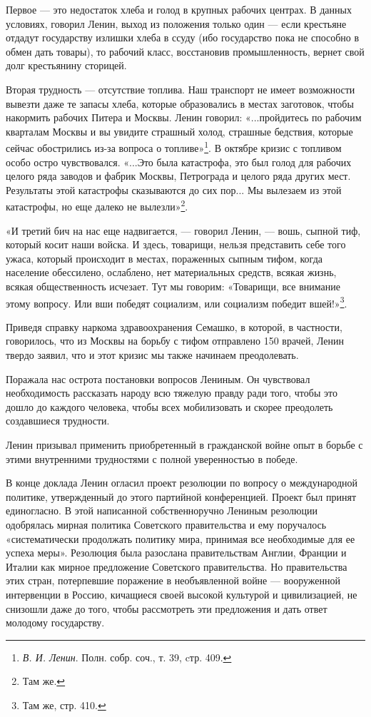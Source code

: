 \documentclass[12pt, a4paper, openany]{book}
\begin{document}
Первое — это недостаток хлеба и голод в крупных рабочих центрах. В данных условиях, говорил Ленин, выход из положения только один — если крестьяне отдадут государству излишки хлеба в ссуду (ибо государство пока не способно в обмен дать товары), то рабочий класс, восстановив промышленность, вернет свой долг крестьянину сторицей.

Вторая трудность — отсутствие топлива. Наш транспорт не имеет возможности вывезти даже те запасы хлеба, которые образовались в местах заготовок, чтобы накормить рабочих Питера и Москвы. Ленин говорил: «...пройдитесь по рабочим кварталам Москвы и вы увидите страшный холод, страшные бедствия, которые сейчас обострились из-за вопроса о топливе»\footnote{\textit{В. И. Ленин}. Полн. собр. соч., т. 39, cтр. 409.}. В октябре кризис с топливом особо остро чувствовался. «...Это была катастрофа, это был голод для рабочих целого ряда заводов и фабрик Москвы, Петрограда и целого ряда других мест. Результаты этой катастрофы сказываются до сих пор... Мы вылезаем из этой катастрофы, но еще далеко не вылезли»\footnote{Там же.}.

«И третий бич на нас еще надвигается, — говорил Ленин, — вошь, сыпной тиф, который косит наши войска. И здесь, товарищи, нельзя представить себе того ужаса, который происходит в местах, пораженных сыпным тифом, когда население обессилено, ослаблено, нет материальных средств, всякая жизнь, всякая общественность исчезает. Тут мы говорим: «Товарищи, все внимание этому вопросу. Или вши победят социализм, или социализм победит вшей!»\footnote{Там же, стр. 410.}.

Приведя справку наркома здравоохранения Семашко, в которой, в частности, говорилось, что из Москвы на борьбу с тифом отправлено 150 врачей, Ленин твердо заявил, что и этот кризис мы также начинаем преодолевать.

Поражала нас острота постановки вопросов Лениным. Он чувствовал необходимость рассказать народу всю тяжелую правду ради того, чтобы это дошло до каждого человека, чтобы всех мобилизовать и скорее преодолеть создавшиеся трудности.

Ленин призывал применить приобретенный в гражданской войне опыт в борьбе с этими внутренними трудностями с полной уверенностью в победе.

В конце доклада Ленин огласил проект резолюции по вопросу о международной политике, утвержденный до этого партийной конференцией. Проект был принят единогласно. В этой написанной собственноручно Лениным резолюции одобрялась мирная политика Советского правительства и ему поручалось «систематически продолжать политику мира, принимая все необходимые для ее успеха меры». Резолюция была разослана правительствам Англии, Франции и Италии как мирное предложение Советского правительства. Но правительства этих стран, потерпевшие поражение в необъявленной войне — вооруженной интервенции в Россию, кичащиеся своей высокой культурой и цивилизацией, не снизошли даже до того, чтобы рассмотреть эти предложения и дать ответ молодому государству.
\end{document}
